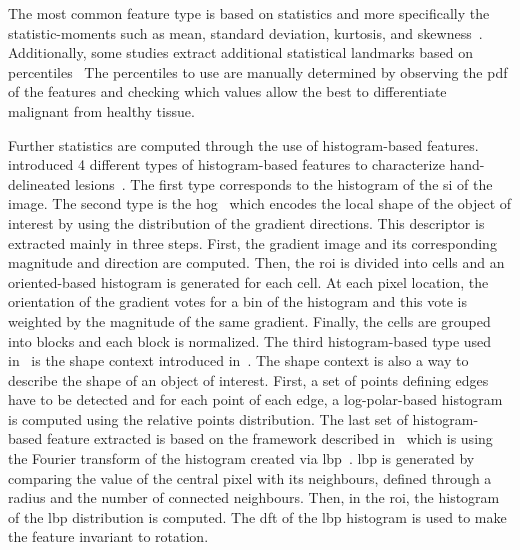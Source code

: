 The most common feature type is based on statistics and more specifically the statistic-moments such as mean, standard deviation, kurtosis, and skewness~\cite{Ampeliotis2007,Ampeliotis2008,Tiwari2009a,Tiwari2010,Tiwari2013,Viswanath2008,Viswanath2009,Viswanath2012,rampun2016quantitative,rampun2015computer,rampun2016computer,Antic2013,Viswanath2011,Peng2013,cameron2014multiparametric,cameron2016maps,khalvati2015automated,chung2015prostate,Litjens2011,Litjens2012,Litjens2014,Niaf2011,Niaf2012,lehaire2014computer}.
Additionally, some studies extract additional statistical landmarks based on percentiles~\cite{Vos2008a,Antic2013,Peng2013,Vos2010,Litjens2011,Litjens2012,Litjens2014,Niaf2011,Niaf2012,Vos2012,lehaire2014computer}
The percentiles to use are manually determined by observing the \ac{pdf} of the features and checking which values allow the best to differentiate malignant from healthy tissue.

Further statistics are computed through the use of histogram-based features.
\citeauthor{Liu2013} introduced 4 different types of histogram-based features to characterize hand-delineated lesions~\cite{Liu2013}.
The first type corresponds to the histogram of the \ac{si} of the image.
The second type is the \ac{hog}~\cite{Dalal2005} which encodes the local shape of the object of interest by using the distribution of the gradient directions.
This descriptor is extracted mainly in three steps.
First, the gradient image and its corresponding magnitude and direction are computed.
Then, the \ac{roi} is divided into cells and an oriented-based histogram is generated for each cell.
At each pixel location, the orientation of the gradient votes for a bin of the histogram and this vote is weighted by the magnitude of the same gradient.
Finally, the cells are grouped into blocks and each block is normalized.
The third histogram-based type used in~\cite{Liu2013} is the shape context introduced in~\cite{Belongie2002}.
The shape context is also a way to describe the shape of an object of interest.
First, a set of points defining edges have to be detected and for each point of each edge, a log-polar-based histogram is computed using the relative points distribution.
The last set of histogram-based feature extracted is based on the framework described in~\cite{Zhao2012} which is using the Fourier transform of the histogram created via \acf{lbp}~\cite{Ojala1996}.
\Ac{lbp} is generated by comparing the value of the central pixel with its neighbours, defined through a radius and the number of connected neighbours.
Then, in the \ac{roi}, the histogram of the \ac{lbp} distribution is computed.
The \acf{dft} of the \ac{lbp} histogram is used to make the feature invariant to rotation.

